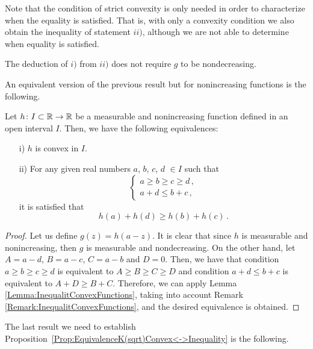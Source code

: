\begin{remark}
\label{Remark:InequalitConvexFunctions} Note that the condition of strict convexity is only needed
in order to characterize when the equality is satisfied. That is, with only a convexity condition
we also obtain the inequality of statement $ii)$, although we are not able to determine when equality is satisfied.
\end{remark}
\begin{remark}
\label{Remark:LeftImplicationDoNotRequireNondecreasing}
The deduction of $i)$ from $ii)$ does not require $g$ to be nondecreasing.
\end{remark}

An equivalent version of the previous result but for nonincreasing functions is the following.

\begin{corollary}
\label{Cor:hDecreasingConvex} Let $h \colon I\subset \mathbb{R} \to \mathbb{R}$ be a measurable and nonincreasing function defined in an open
interval $I$. Then, we have the following
equivalences:
\begin{enumerate}
\item[i)] $h$ is convex in $I$.
\item[ii)] For any given real numbers $a$, $b$, $c$, $d$ $\in I$ such that
\begin{equation*}
\begin{cases}
a \geq b \geq c \geq d \,, \\
a + d \leq b + c\,,
\end{cases}
\end{equation*}
it is satisfied that
$$ h(a) + h(d) \geq h(b) + h(c)\,.$$
\end{enumerate}
\end{corollary}

\begin{proof}
Let us define $g(z) = h(a-z)$. It is clear that since $h$ is measurable and nonincreasing, then $g$
is measurable and nondecreasing. On the other hand, let $A=a-d$, $B=a-c$, $C=a-b$ and $D=0$. Then,
we have that condition $a \geq b \geq c \geq d$ is equivalent to $A\geq B \geq C \geq D$ and
condition $a+d\leq b+c$ is equivalent to $A+D\geq B+C$. Therefore, we can apply Lemma
\ref{Lemma:InequalitConvexFunctions}, taking into account Remark
\ref{Remark:InequalitConvexFunctions}, and the desired equivalence is obtained.
\end{proof}

The last result we need to establish Proposition~\ref{Prop:EquivalenceK(sqrt)Convex<->Inequality} is the following.

